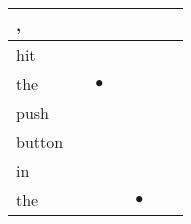 \documentclass[landscape]{article}
\newcommand{\ssp}{\hspace{2pt}}
\newcommand{\mex}{\cellcolor{g}$\bullet$}
\begin{document}
\begin{tabular}{|l|p{10pt}|p{10pt}|p{10pt}|p{10pt}|p{10pt}|p{10pt}|}
\hline
\ssp , \ssp&\hspace{2pt}&\hspace{2pt}&\hspace{2pt}&\hspace{2pt}&\hspace{2pt}&\hspace{2pt}\\
\hline
\ssp hit \ssp&\hspace{2pt}&\hspace{2pt}&\hspace{2pt}&\hspace{2pt}&\hspace{2pt}&\hspace{2pt}\\
\hline
\ssp \cellcolor{ref1}the \ssp&\hspace{2pt}&\hspace{2pt}\mex&\hspace{2pt}&\hspace{2pt}&\hspace{2pt}&\hspace{2pt}\\
\hline
\ssp push \ssp&\hspace{2pt}&\hspace{2pt}&\hspace{2pt}&\hspace{2pt}&\hspace{2pt}&\hspace{2pt}\\
\hline
\ssp button \ssp&\hspace{2pt}&\hspace{2pt}&\hspace{2pt}&\hspace{2pt}&\hspace{2pt}&\hspace{2pt}\\
\hline
\ssp in \ssp&\hspace{2pt}&\hspace{2pt}&\hspace{2pt}&\hspace{2pt}&\hspace{2pt}&\hspace{2pt}\\
\hline
\ssp \cellcolor{ref3}the \ssp&\hspace{2pt}&\hspace{2pt}&\hspace{2pt}&\hspace{2pt}\mex&\hspace{2pt}&\hspace{2pt}\\

\end{tabular}
\end{document}
